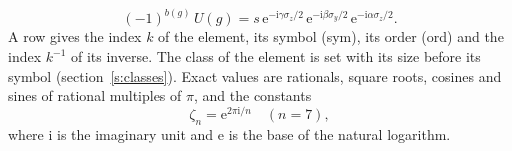 \documentclass[10pt,a4paper]{article}
\numberwithin{equation}{section}
\newcommand{\iunit}{\mathrm{i}}
\newcommand{\expe}{\mathrm{e}}
\newcommand{\rootunity}[1]{\zeta_{#1}}
\newcommand{\pauli}[1]{\sigma_{#1}}
\begin{document}
\begin{equation}\label{e:euler}(-1)^{b(g)}\,U(g) = s\,\expe^{-\iunit\gamma\pauli{z}/2}\,\expe^{-\iunit\beta\pauli{y}/2}\,\expe^{-\iunit\alpha\pauli{z}/2}.\end{equation}
\leavevmode\label{n:index.element.inverse}\label{n:head.sym}\label{n:head.ord}A row gives the index $k$ of the element, its symbol (sym), its order (ord) and the index $k^{-1}$ of its inverse. \label{n:head.class}The class of the element is set with its size before its symbol (section~\ref{s:classes}).
\leavevmode\label{n:constant.root}\label{n:index.root.order}Exact values are rationals, square roots, cosines and sines of rational multiples of $\pi$, and the constants
\begin{equation}\label{e:constants}\rootunity{n} = \expe^{2\pi\iunit/n}\quad(n = 7),\end{equation}
where $\iunit$ is the imaginary unit and $\expe$ is the base of the natural logarithm.
\end{document}
